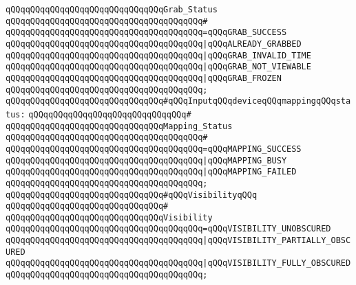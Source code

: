 \verb|qQQqqQQqqQQqqQQqqQQqqQQqqQQqqQQqGrab_Status|\newline
\verb|qQQqqQQqqQQqqQQqqQQqqQQqqQQqqQQqqQQqqQQq#|\newline
\verb|qQQqqQQqqQQqqQQqqQQqqQQqqQQqqQQqqQQqqQQq=qQQqGRAB_SUCCESS|\newline
\verb|qQQqqQQqqQQqqQQqqQQqqQQqqQQqqQQqqQQqqQQq|\verb#|qQQqALREADY_GRABBED#\newline
\verb|qQQqqQQqqQQqqQQqqQQqqQQqqQQqqQQqqQQqqQQq|\verb#|qQQqGRAB_INVALID_TIME#\newline
\verb|qQQqqQQqqQQqqQQqqQQqqQQqqQQqqQQqqQQqqQQq|\verb#|qQQqGRAB_NOT_VIEWABLE#\newline
\verb|qQQqqQQqqQQqqQQqqQQqqQQqqQQqqQQqqQQqqQQq|\verb#|qQQqGRAB_FROZEN#\newline
\verb|qQQqqQQqqQQqqQQqqQQqqQQqqQQqqQQqqQQqqQQq;|\newline
\newline
\verb|qQQqqQQqqQQqqQQqqQQqqQQqqQQqqQQq#qQQqInputqQQqdeviceqQQqmappingqQQqstatus:|\newline
\verb|qQQqqQQqqQQqqQQqqQQqqQQqqQQqqQQq#|\newline
\verb|qQQqqQQqqQQqqQQqqQQqqQQqqQQqqQQqMapping_Status|\newline
\verb|qQQqqQQqqQQqqQQqqQQqqQQqqQQqqQQqqQQqqQQq#|\newline
\verb|qQQqqQQqqQQqqQQqqQQqqQQqqQQqqQQqqQQqqQQq=qQQqMAPPING_SUCCESS|\newline
\verb|qQQqqQQqqQQqqQQqqQQqqQQqqQQqqQQqqQQqqQQq|\verb#|qQQqMAPPING_BUSY#\newline
\verb|qQQqqQQqqQQqqQQqqQQqqQQqqQQqqQQqqQQqqQQq|\verb#|qQQqMAPPING_FAILED#\newline
\verb|qQQqqQQqqQQqqQQqqQQqqQQqqQQqqQQqqQQqqQQq;|\newline
\newline
\verb|qQQqqQQqqQQqqQQqqQQqqQQqqQQqqQQq#qQQqVisibilityqQQq|\newline
\verb|qQQqqQQqqQQqqQQqqQQqqQQqqQQqqQQq#|\newline
\verb|qQQqqQQqqQQqqQQqqQQqqQQqqQQqqQQqVisibility|\newline
\verb|qQQqqQQqqQQqqQQqqQQqqQQqqQQqqQQqqQQqqQQq=qQQqVISIBILITY_UNOBSCURED|\newline
\verb|qQQqqQQqqQQqqQQqqQQqqQQqqQQqqQQqqQQqqQQq|\verb#|qQQqVISIBILITY_PARTIALLY_OBSCURED#\newline
\verb|qQQqqQQqqQQqqQQqqQQqqQQqqQQqqQQqqQQqqQQq|\verb#|qQQqVISIBILITY_FULLY_OBSCURED#\newline
\verb|qQQqqQQqqQQqqQQqqQQqqQQqqQQqqQQqqQQqqQQq;|\newline

